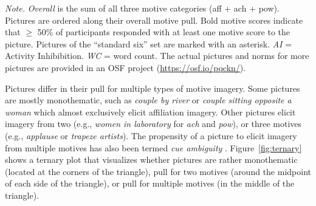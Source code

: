 \documentclass[jou,a4paper]{apa6}\usepackage[]{graphicx}\usepackage[]{color}
\begin{document}
\begin{table}
\begin{threeparttable}
\begin{tabularx}{\textwidth}{rlllllllr}
		
		\bottomrule
		\end{tabularx}
		\begin{tablenotes}[para,flushleft]
			{\small
			\vspace*{0.75em}
			\textit{Note.} \emph{Overall} is the sum of all three motive categories (aff + ach + pow). Pictures are ordered along their overall motive pull. Bold motive scores indicate that $\geq$ 50\% of participants responded with at least one motive score to the picture. Pictures of the ``standard six'' set are marked with an asterisk.  \emph{AI} = Activity Inhibibition. \emph{WC} = word count. The actual pictures and norms for more pictures are provided in an OSF project (\url{https://osf.io/pqckn/}).}
	      \end{tablenotes}
	  \end{threeparttable}
\end{table}


Pictures differ in their pull for multiple types of motive imagery. Some pictures are mostly monothematic, such as \emph{couple by river} or \emph{couple sitting opposite a woman} which almost exclusively elicit affiliation imagery. Other pictures elicit imagery from two (e.g., \emph{women in laboratory} for \emph{ach} and \emph{pow}), or three motives (e.g., \emph{applause} or \emph{trapeze artists}). The propensity of a picture to elicit imagery from multiple motives has also been termed \emph{cue ambiguity} \parencite{pang_ContentCodingMethods_2010,smith_MethodologicalConsiderationsSteps_1992,jacobs_MethodInvestigatingCue_1958}.
Figure~\ref{fig:ternary} shows a ternary plot \parencite{hamiltonGgternExtensionGgplot22017} that visualizes whether pictures are rather monothematic (located at the corners of the triangle), pull for two motives (around the midpoint of each side of the triangle), or pull for multiple motives (in the middle of the triangle).
\end{document}
